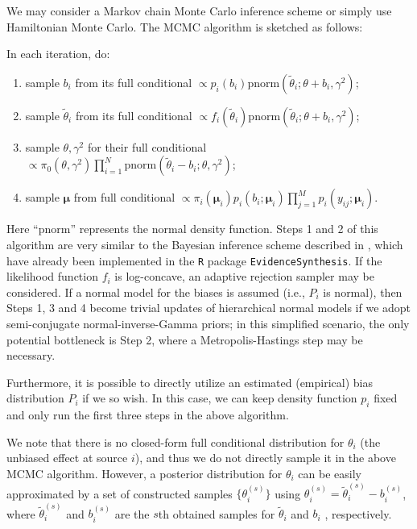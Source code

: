 \documentclass{article}
\begin{document}
We may consider a Markov chain Monte Carlo inference scheme or simply use Hamiltonian Monte Carlo. The MCMC algorithm is sketched as follows:

In each iteration, do:
\begin{enumerate}
    \item sample $b_i$ from its full conditional $\propto p_i(b_i)\text{pnorm}(\tilde\theta_i; \theta+b_i, \gamma^2)$;
    \item sample $\tilde\theta_i$ from its full conditional $\propto f_i(\tilde\theta_i)\text{pnorm}(\tilde\theta_i; \theta+b_i, \gamma^2)$;
    \item sample $\theta, \gamma^2$ for their full conditional $\propto \pi_0(\theta, \gamma^2) \prod_{i=1}^N \text{pnorm}(\tilde\theta_i-b_i; \theta, \gamma^2)$;
    \item sample $\boldsymbol\mu$ from full conditional $\propto \pi_i(\boldsymbol\mu_i) p_i(b_i; \boldsymbol\mu_i) \prod_{j=1}^M p_i(y_{ij}; \boldsymbol\mu_i)$.
\end{enumerate}
Here ``$\text{pnorm}$'' represents the normal density function.
Steps 1 and 2 of this algorithm are very similar to the Bayesian inference scheme described in \cite{schuemie2021combining}, which have already been implemented in the \texttt{R} package \texttt{EvidenceSynthesis}. If the likelihood function $f_i$ is log-concave, an adaptive rejection sampler \citep{gilks1992adaptive} may be considered. 
If a normal model for the biases is assumed (i.e., $P_i$ is normal),
then Steps 1, 3 and 4 become trivial updates of hierarchical normal models if we adopt semi-conjugate normal-inverse-Gamma priors;
in this simplified scenario, the only potential bottleneck is Step 2, where a Metropolis-Hastings step may be necessary.

Furthermore, it is possible to directly utilize an estimated (empirical) bias distribution $P_i$ if we so wish.
In this case, we can keep density function $p_i$ fixed and only run the first three steps in the above algorithm.

We note that there is no closed-form full conditional distribution for $\theta_i$ (the unbiased effect at source $i$), and thus we do not directly sample it in the above MCMC algorithm. 
However, a posterior distribution for $\theta_i$ can be easily approximated by a set of constructed samples $\{\theta_i^{(s)}\}$ using $\theta_i^{(s)} = \tilde\theta_i^{(s)} - b_i^{(s)}$, 
where $\tilde\theta_i^{(s)}$ and $b_i^{(s)}$ are the $s$th obtained samples for $\tilde\theta_i$ and $b_i$ , respectively. 
\end{document}
